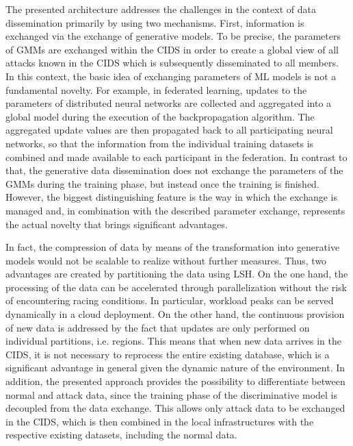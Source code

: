\documentclass[../../main.tex]{subfiles}
\begin{document}
The presented architecture addresses the challenges in the context of data dissemination primarily by using two mechanisms. First, information is exchanged via the exchange of generative models. To be precise, the parameters of GMMs are exchanged within the CIDS in order to create a global view of all attacks known in the CIDS which is subsequently disseminated to all members. In this context, the basic idea of exchanging parameters of ML models is not a fundamental novelty. For example, in federated learning, updates to the parameters of distributed neural networks are collected and aggregated into a global model during the execution of the backpropagation algorithm. The aggregated update values are then propagated back to all participating neural networks, so that the information from the individual training datasets is combined and made available to each participant in the federation. In contrast to that, the generative data dissemination does not exchange the parameters of the GMMs during the training phase, but instead once the training is finished. However, the biggest distinguishing feature is the way in which the exchange is managed and, in combination with the described parameter exchange, represents the actual novelty that brings significant advantages.

In fact, the compression of data by means of the transformation into generative models would not be scalable to realize without further measures. Thus, two advantages are created by partitioning the data using LSH. On the one hand, the processing of the data can be accelerated through parallelization without the risk of encountering racing conditions. In particular, workload peaks can be served dynamically in a cloud deployment. On the other hand, the continuous provision of new data is addressed by the fact that updates are only performed on individual partitions, i.e. regions. This means that when new data arrives in the CIDS, it is not necessary to reprocess the entire existing database, which is a significant advantage in general given the dynamic nature of the environment. In addition, the presented approach provides the possibility to differentiate between normal and attack data, since the training phase of the discriminative model is decoupled from the data exchange. This allows only attack data to be exchanged in the CIDS, which is then combined in the local infrastructures with the respective existing datasets, including the normal data.

\end{document}
